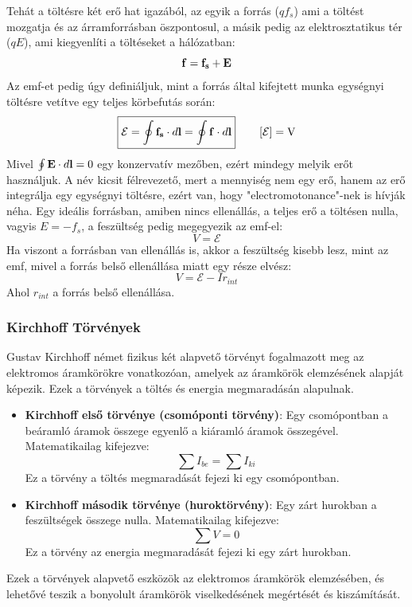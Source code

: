 \documentclass[a4paper,12pt]{article}
\begin{document}
Tehát a töltésre két erő hat igazából, az egyik a forrás ($qf_s$) ami a töltést mozgatja és az árramforrásban öszpontosul, a másik pedig az elektrosztatikus tér ($qE$), ami kiegyenlíti a töltéseket a hálózatban:
\begin{equation}
    \bold{f} = \bold{f_s} + \bold{E}
\end{equation}
Az emf-et pedig úgy definiáljuk, mint a forrás által kifejtett munka egységnyi töltésre vetítve egy teljes körbefutás során:
\begin{equation}
    \boxed{\mathcal{E} = \oint \bold{f_s} \cdot d\bold{l} = \oint \bold{f} \cdot d\bold{l}} \qquad \left[\mathcal{E}\right] = \text{V}
\end{equation}
Mivel $\oint \bold{E} \cdot d\bold{l} = 0$ egy konzervatív mezőben, ezért mindegy melyik erőt használjuk. A név kicsit félrevezető, mert a mennyiség nem egy erő,
hanem az erő integrálja egy egységnyi töltésre, ezért van, hogy "electromotonance"-nek is hívják néha. Egy ideális forrásban, amiben nincs ellenállás, a teljes erő a töltésen nulla, vagyis $E = - f_s$, a feszültség pedig megegyezik az emf-el:
\begin{equation}
    V = \mathcal{E}
\end{equation}
Ha viszont a forrásban van ellenállás is, akkor a feszültség kisebb lesz, mint az emf, mivel a forrás belső ellenállása miatt egy része elvész:
\begin{equation}
    V = \mathcal{E} - Ir_{int}
\end{equation}
Ahol $r_{int}$ a forrás belső ellenállása.

\subsubsection{Kirchhoff Törvények}
Gustav Kirchhoff német fizikus két alapvető törvényt fogalmazott meg az elektromos áramkörökre vonatkozóan, amelyek az áramkörök elemzésének alapját képezik. Ezek a törvények a töltés és energia megmaradásán alapulnak.  
\begin{itemize}
    \item \textbf{Kirchhoff első törvénye (csomóponti törvény)}: Egy csomópontban a beáramló áramok összege egyenlő a kiáramló áramok összegével. Matematikailag kifejezve:
    \begin{equation}
        \sum I_{be} = \sum I_{ki}
    \end{equation}
    Ez a törvény a töltés megmaradását fejezi ki egy csomópontban.
    
    \item \textbf{Kirchhoff második törvénye (huroktörvény)}: Egy zárt hurokban a feszültségek összege nulla. Matematikailag kifejezve:
    \begin{equation}
        \sum V = 0
    \end{equation}
    Ez a törvény az energia megmaradását fejezi ki egy zárt hurokban.
\end{itemize}
Ezek a törvények alapvető eszközök az elektromos áramkörök elemzésében, és lehetővé teszik a bonyolult áramkörök viselkedésének megértését és kiszámítását.
\end{document}
